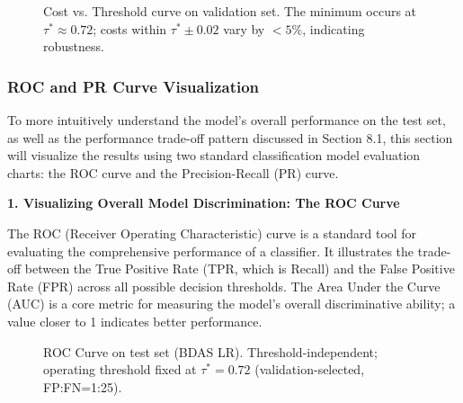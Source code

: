 \documentclass[sigplan,screen]{acmart}
\begin{document}
\begin{figure}[h]
  \centering
  \caption{Cost vs. Threshold curve on validation set. The minimum occurs at $\tau^*\approx0.72$; costs within $\tau^*\pm0.02$ vary by $<5\%$, indicating robustness.}
  \label{fig:cost-curve}
\end{figure}

\subsubsection{ROC and PR Curve Visualization}

To more intuitively understand the model's overall performance on the test set, as well as the performance trade-off pattern discussed in Section 8.1, this section will visualize the results using two standard classification model evaluation charts: the ROC curve and the Precision-Recall (PR) curve.

\textbf{1. Visualizing Overall Model Discrimination: The ROC Curve}

The ROC (Receiver Operating Characteristic) curve is a standard tool for evaluating the comprehensive performance of a classifier. It illustrates the trade-off between the True Positive Rate (TPR, which is Recall) and the False Positive Rate (FPR) across all possible decision thresholds. The Area Under the Curve (AUC) is a core metric for measuring the model's overall discriminative ability; a value closer to 1 indicates better performance.

\begin{figure}[h]
  \centering
  \caption{ROC Curve on test set (BDAS LR). Threshold-independent; operating threshold fixed at $\tau^*=0.72$ (validation-selected, FP:FN=1:25).}
  \label{fig:roc-curve}
\end{figure}
\end{document}

